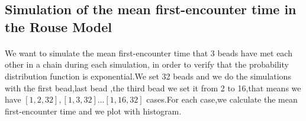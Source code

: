 \documentclass{article}
\begin{document}
\subsection{Simulation of the mean first-encounter time in the Rouse Model}
\paragraph{}
We want to simulate the mean first-encounter time that 3 beads have met each other in a chain during each simulation, in order to verify that the probability distribution function is exponential.We set 32 beads and we do the simulations with the first bead,last bead ,the third bead we set it from 2 to 16,that means we have $[1,2,32],[1,3,32]...[1,16,32]$ cases.For each case,we calculate the mean first-encounter time and we plot with histogram.
\end{document}
